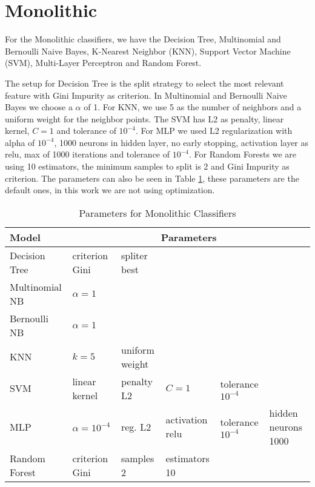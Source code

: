 \section{Monolithic}\label{mono}

For the Monolithic classifiers, we have the Decision Tree, Multinomial and Bernoulli Naive Bayes, K-Nearest Neighbor (KNN), Support Vector Machine (SVM), Multi-Layer Perceptron and Random Forest.

The setup for Decision Tree is the split strategy to select the most relevant feature with Gini Impurity as criterion. In Multinomial and Bernoulli Naive Bayes we choose a $\alpha$ of 1. For KNN, we use 5 as the number of neighbors and a uniform weight for the neighbor points. The SVM has L2 as penalty, linear kernel, $C = 1$ and tolerance of $10^{-4}$. For MLP we used L2 regularization with alpha of $10^{-4}$, 1000 neurons in hidden layer, no early stopping, activation layer as relu, max of 1000 iterations and tolerance of $10^{-4}$. For Random Forests we are using 10 estimators, the minimum samples to split is 2 and Gini Impurity as criterion. The parameters can also be seen in Table \ref{table:monolithic_params}, these parameters are the default ones, in this work we are not using optimization.

\begin{table}[h!]
    \centering
    \renewcommand{\arraystretch}{1.8}
    \begin{tabular}{ p{4cm}p{1.62cm}|p{1.5cm}|p{1.5cm}|p{1.5cm}|p{1.5cm} }
        \toprule
        Model & \multicolumn{5}{c}{Parameters} \\
        \midrule
        Decision Tree & criterion Gini & spliter best & & &\\
        Multinomial NB & $\alpha = 1$ & & & &\\
        Bernoulli NB & $\alpha = 1$ & & & &\\
        KNN & $ k = 5 $ & uniform weight & & &\\
        SVM & linear \newline kernel & penalty L2 & $C = 1$ & tolerance $10^{-4}$ &\\
        MLP  & $ \alpha = 10^{-4} $ & reg. L2  & activation relu & tolerance $10^{-4}$ & hidden neurons 1000 \\
        Random Forest & criterion Gini & samples 2 & estimators 10 & & \\ [1ex]
        \bottomrule
        \end{tabular}
        \caption{%
        Parameters for Monolithic Classifiers%
        }\label{table:monolithic_params}
        \vspace{4ex}
\end{table}


